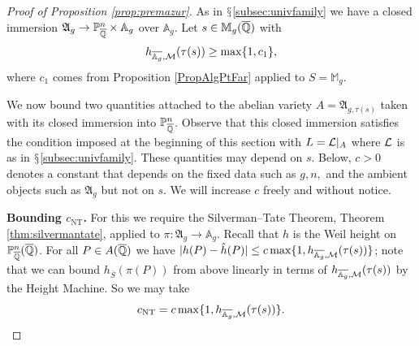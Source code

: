 \begin{proof}[Proof of Proposition \ref{prop:premazur}]
  As in $\mathsection$\ref{subsec:univfamily} %
  we have a
  closed immersion 
  $\mathfrak{A}_g \rightarrow{\mathbb{P}}^n_{\overline{\mathbb{Q}}}\times \mathbb{A}_g$ over $\mathbb{A}_g$.
  Let $s\in \mathbb{M}_g({\overline{\mathbb{Q}}})$  with
  \begin{equation}
    \label{eq:hslbc1}
    h_{\overline{\mathbb{A}_g},{\mathcal M}}(\tau(s)) \ge \max\{1,c_1\},
  \end{equation}
  where $c_1$
  comes from Proposition \ref{PropAlgPtFar} applied to $S = \mathbb{M}_g$.

  We now bound two quantities attached to the abelian variety
  $A=\mathfrak{A}_{g,\tau(s)}$ taken with its closed immersion into
  ${\mathbb{P}}_{\overline{\mathbb{Q}}}^n$. Observe that this closed immersion satisfies the
  condition imposed at the beginning of this section with $L={\mathcal L}|_A$
  where ${\mathcal L}$ is as in $\mathsection$\ref{subsec:univfamily}.
  These quantities may depend on $s$. Below, $c>0$ denotes a constant
  that depends on the fixed data such as $g,n,$ and the ambient
  objects such as $\mathfrak{A}_g$ but not on  $s$.
  We will increase $c$ freely and without notice.

  \medskip
  \textbf{Bounding $c_{\mathrm{NT}}$.} For this we require the
  Silverman--Tate Theorem, Theorem \ref{thm:silvermantate}, applied to
  $\pi \colon \mathfrak{A}_g \rightarrow \mathbb{A}_g$. Recall that $h$ is the Weil 
  height on ${\mathbb{P}}^n_{{\overline{\mathbb{Q}}}}({\overline{\mathbb{Q}}})$.
  For all $P\in
  A({\overline{\mathbb{Q}}})$ we have $|h(P)-\hat h(P)|\le c
  \max\{1,h_{\overline{\mathbb{A}_g},{\mathcal M}}(\tau(s))\}$;
  note that we can bound $h_{\overline S}(\pi(P))$ from above linearly
  in terms of $h_{\overline{\mathbb{A}_g},{\mathcal M}}(\tau(s))$ by the Height Machine.
  So we may take 
  \begin{equation}
    \label{eq:choosecNT}
    c_{\mathrm{NT}} = c\max\{1,h_{\overline{\mathbb{A}_g},{\mathcal M}}(\tau(s))\}.    
  \end{equation}


\end{proof}
